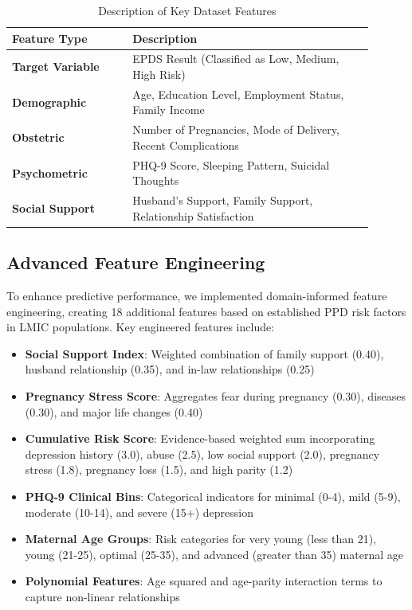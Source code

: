 \begin{table}[htbp]
    \caption{Description of Key Dataset Features}
    \label{tab:dataset_features}
    \centering
    \begin{tabular}{p{0.3\linewidth}p{0.6\linewidth}}
        \toprule
        \textbf{Feature Type} & \textbf{Description} \\
        \midrule
        \textbf{Target Variable} & EPDS Result (Classified as Low, Medium, High Risk) \\
        \addlinespace
        \textbf{Demographic} & Age, Education Level, Employment Status, Family Income \\
        \addlinespace
        \textbf{Obstetric} & Number of Pregnancies, Mode of Delivery, Recent Complications \\
        \addlinespace
        \textbf{Psychometric} & PHQ-9 Score, Sleeping Pattern, Suicidal Thoughts \\
        \addlinespace
        \textbf{Social Support} & Husband's Support, Family Support, Relationship Satisfaction \\
        \bottomrule
    \end{tabular}
\end{table}

\subsection{Advanced Feature Engineering}
To enhance predictive performance, we implemented domain-informed feature engineering, creating 18 additional features based on established PPD risk factors in LMIC populations. Key engineered features include:

\begin{itemize}
    \item \textbf{Social Support Index}: Weighted combination of family support (0.40), husband relationship (0.35), and in-law relationships (0.25)
    \item \textbf{Pregnancy Stress Score}: Aggregates fear during pregnancy (0.30), diseases (0.30), and major life changes (0.40)
    \item \textbf{Cumulative Risk Score}: Evidence-based weighted sum incorporating depression history (3.0), abuse (2.5), low social support (2.0), pregnancy stress (1.8), pregnancy loss (1.5), and high parity (1.2)
    \item \textbf{PHQ-9 Clinical Bins}: Categorical indicators for minimal (0-4), mild (5-9), moderate (10-14), and severe (15+) depression
    \item \textbf{Maternal Age Groups}: Risk categories for very young (less than 21), young (21-25), optimal (25-35), and advanced (greater than 35) maternal age
    \item \textbf{Polynomial Features}: Age squared and age-parity interaction terms to capture non-linear relationships
\end{itemize}

